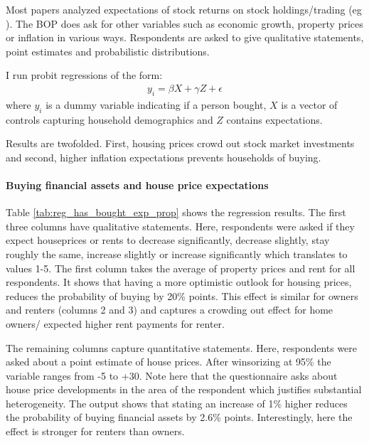 \documentclass[ProjectABM]{subfiles}
\begin{document}
Most papers analyzed expectations of stock returns on stock holdings/trading (eg \cite{dominitz_manski_2011measuring_expectations, giglio_et_al_2019five}). The BOP does ask for other variables such as economic growth, property prices or inflation in various ways. Respondents are asked to give qualitative statements, point estimates and probabilistic distributions.

I run probit regressions of the form:
\begin{align}
	y_i = \beta X + \gamma Z + \epsilon
\end{align}
where $y_i$ is a dummy variable indicating if a person bought, $X$ is a vector of controls capturing household demographics and $Z$ contains expectations.

Results are twofolded. First, housing prices crowd out stock market investments and second, higher inflation expectations prevents households of buying.

\paragraph{Buying financial assets and house price expectations}
Table \ref{tab:reg_has_bought_exp_prop} shows the regression results. The first three columns have qualitative statements. Here, respondents were asked if they expect houseprices or rents to decrease significantly, decrease slightly, stay roughly the same, increase slightly or increase significantly which translates to values 1-5. The first column takes the average of property prices and rent for all respondents. It shows that having a more optimistic outlook for housing prices, reduces the probability of buying by 20\% points. This effect is similar for owners and renters (columns 2 and 3) and captures a crowding out effect for home owners/ expected higher rent payments for renter.

The remaining columns capture quantitative statements. Here, respondents were asked about a point estimate of house prices. After winsorizing at 95\% the variable ranges from -5 to +30. Note here that the questionnaire asks about house price developments in the area of the respondent which justifies substantial heterogeneity. The output shows that stating an increase of 1\% higher reduces the probability of buying financial assets by 2.6\% points. Interestingly, here the effect is stronger for renters than owners.
\end{document}
